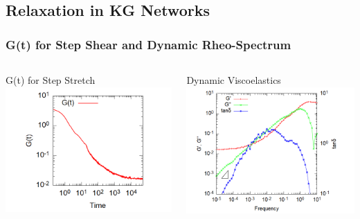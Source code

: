 \documentclass[12pt, dvipdfmx]{beamer}
\begin{document}
\subsection{Relaxation in KG Networks}
\begin{frame}
	\frametitle{
		G(t) for Step Shear and Dynamic Rheo-Spectrum
	}
	\vspace{-2mm}
	\begin{columns}[c, onlytextwidth]
			\begin{block}{G(t) for Step Stretch}
				\centering
					\includegraphics[width=\textwidth]{gt_4chain_N50_stepstretch.png}
			\end{block}
			\begin{exampleblock}{Dynamic Viscoelastics}
				\centering
					\includegraphics[width=\textwidth]{gw_4chain_N50_stepstretch.png}
			\end{exampleblock}
	\end{columns}


\end{frame}
\end{document}
